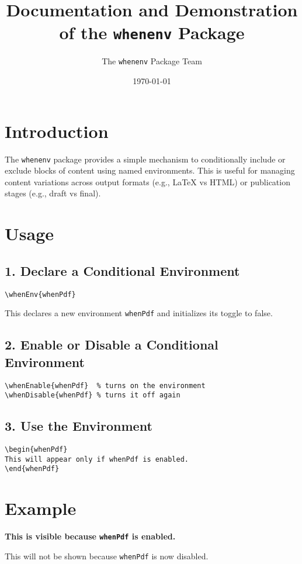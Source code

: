 \documentclass{article}
\begin{document}
\title{Documentation and Demonstration of the \texttt{whenenv} Package}
\author{The \texttt{whenenv} Package Team}
\date{\today}
\maketitle

\section*{Introduction}
The \texttt{whenenv} package provides a simple mechanism to conditionally include or exclude blocks of content using named environments. This is useful for managing content variations across output formats (e.g., LaTeX vs HTML) or publication stages (e.g., draft vs final).

\section*{Usage}

\subsection*{1. Declare a Conditional Environment}
\begin{verbatim}
\whenEnv{whenPdf}
\end{verbatim}
This declares a new environment \texttt{whenPdf} and initializes its toggle to false.

\subsection*{2. Enable or Disable a Conditional Environment}
\begin{verbatim}
\whenEnable{whenPdf}  % turns on the environment
\whenDisable{whenPdf} % turns it off again
\end{verbatim}

\subsection*{3. Use the Environment}
\begin{verbatim}
\begin{whenPdf}
This will appear only if whenPdf is enabled.
\end{whenPdf}
\end{verbatim}

\section*{Example}


\begin{whenPdf}
\textbf{This is visible because \texttt{whenPdf} is enabled.}
\end{whenPdf}


\begin{whenPdf}
This will not be shown because \texttt{whenPdf} is now disabled.
\end{whenPdf}
\end{document}
